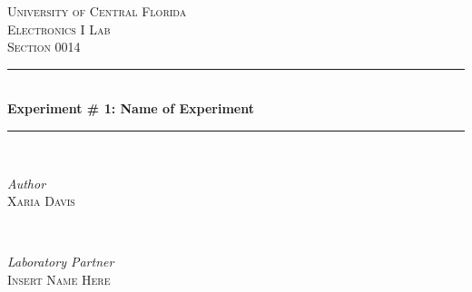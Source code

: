 \documentclass{article}
\begin{document}
	\begin{titlepage} %
		\newcommand{\HRule}{\rule{\linewidth}{0.5mm}} %
		
		\center %
		
		
		\textsc{\LARGE University of Central Florida}\\[1.5cm] %
		
		\textsc{\Large Electronics I Lab}\\[0.5cm] %
		
		\textsc{\large Section 0014}\\[0.5cm] %
		
		
		\HRule\\[0.4cm]
		
		{\huge\bfseries Experiment \# 1: Name of Experiment}\\[0.4cm] %
		
		\HRule\\[1.5cm]
		
		
		\begin{minipage}{0.4\textwidth}
			\begin{flushleft}
				\large
				\textit{Author}\\
				\textsc{Xaria Davis} %
			\end{flushleft}
		\end{minipage}
		~
		\begin{minipage}{0.4\textwidth}
			\begin{flushright}
				\large
				\textit{Laboratory Partner}\\
				\textsc{Insert Name Here} %
			\end{flushright}
		\end{minipage}
		

\end{titlepage}
\end{document}
